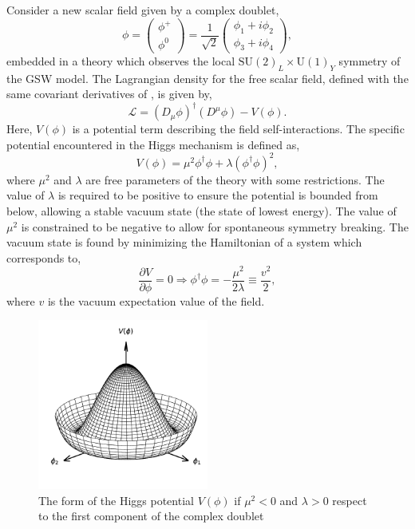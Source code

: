 Consider a new scalar field given by a complex doublet,
\begin{equation}
    \phi = \begin{pmatrix} \phi^+ \\ \phi^0 \end{pmatrix} = \frac{1}{\sqrt{2}} \begin{pmatrix} \phi_1 + i \phi_2 \\ \phi_3 + i \phi_4 \end{pmatrix},
\end{equation}
embedded in a theory which observes the local $\text{SU}(2)_L \times \text{U}(1)_Y$ symmetry of the GSW model.
The Lagrangian density for the free scalar field, defined with the same covariant derivatives of , is given by,
\begin{equation}
    \label{eq:higgs_lagrangian}
    \mathcal{L} = (D_\mu \phi)^\dagger (D^\mu \phi) - V(\phi).
\end{equation}
Here, $V(\phi)$ is a potential term describing the field self-interactions.
The specific potential encountered in the Higgs mechanism is defined as,
\begin{equation}
    \label{eq:higgs_potential}
    V(\phi) = \mu^2 \phi^\dagger \phi + \lambda (\phi^\dagger \phi)^2,
\end{equation}
where $\mu^2$ and $\lambda$ are free parameters of the theory with some restrictions.
The value of $\lambda$ is required to be positive to ensure the potential is bounded from below, allowing a stable vacuum state (the state of lowest energy).
The value of $\mu^2$ is constrained to be negative to allow for spontaneous symmetry breaking.
The vacuum state is found by minimizing the Hamiltonian of a system which corresponds to,
\begin{equation}
    \frac{\partial V}{\partial \phi} = 0 \Longrightarrow  \phi^\dagger \phi = -\frac{\mu^2}{2\lambda} \equiv \frac{v^2}{2},
\end{equation}
where $v$ is the vacuum expectation value of the field.

\begin{figure}[h]
    \centering
    \includegraphics[width=0.5\textwidth]{Figures/standard_model/mexican_hat_potential}
    \caption{The form of the Higgs potential $V(\phi)$ if $\mu^2 < 0$ and $\lambda > 0$ respect to the first component of the complex doublet}
    \label{fig:mexican_hat}
\end{figure}

